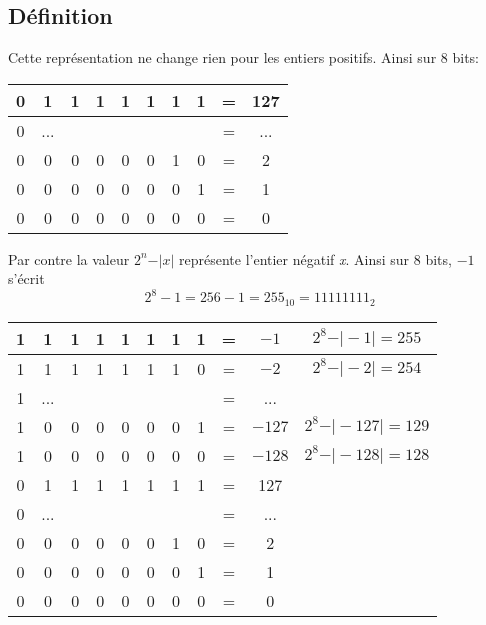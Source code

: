 \documentclass[a4paper,11pt]{article}
\begin{document}
\begin{Form}
\subsection{Définition}
Cette représentation ne change rien pour les entiers positifs. Ainsi sur 8 bits:
\begin{center}
\begin{tabular}{|cccccccccc|}
\hline
0 & 1 & 1 & 1 & 1 & 1 & 1 & 1 & =& 127 \\ 
\hline
0 & ... &  &  &  &  &  &  & =& ... \\ 
\hline
0 & 0 & 0 & 0 & 0 & 0 & 1 & 0 & =& 2 \\
\hline 
0 & 0 & 0 & 0 & 0 & 0 & 0 & 1 & =& 1 \\ 
\hline
0 & 0 & 0 & 0 & 0 & 0 & 0 & 0 & =& 0 \\
\hline
\end{tabular}
\end{center}
\medskip
Par contre la valeur $2^n - \vert x\vert$ représente l'entier négatif \emph{x}. Ainsi sur 8 bits, $-1$ s'écrit $$2^8-1 = 256 - 1 = 255_{10} = 11111111_2$$
\begin{center}
\begin{tabular}{|cccccccccc|c|}
\hline
1 & 1 & 1 & 1 & 1 & 1 & 1 & 1 & =& $-1$ & $2^8 - \vert -1\vert = 255$ \\
\hline
1 & 1 & 1 & 1 & 1 & 1 & 1 & 0 & = &$-2$& $2^8 - \vert -2\vert = 254$ \\
\hline
1 & ... &  &  &  &  &  &  & = &... &\\ 
\hline
1 & 0 & 0 & 0 & 0 & 0 & 0 & 1 & =& $-127$&$2^8 - \vert -127\vert = 129$ \\
\hline
1 & 0 & 0 & 0 & 0 & 0 & 0 & 0 & = &$-128$&$2^8 - \vert -128\vert=128$ \\
\hline
0 & 1 & 1 & 1 & 1 & 1 & 1 & 1 & =& 127& \\ 
\hline
0 & ... &  &  &  &  &  &  & =& ...& \\ 
\hline
0 & 0 & 0 & 0 & 0 & 0 & 1 & 0 & = &2 &\\
\hline 
0 & 0 & 0 & 0 & 0 & 0 & 0 & 1 & = &1& \\ 
\hline
0 & 0 & 0 & 0 & 0 & 0 & 0 & 0 & =& 0& \\
\hline
\end{tabular}
\end{center}

\end{Form}
\end{document}

